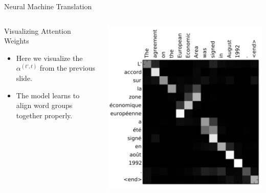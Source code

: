 \documentclass[aspectratio=169]{beamer}
\begin{document}
\begin{frame}{Neural Machine Translation}
\begin{columns}
\begin{column}{0.5\textwidth}
   \centering
   Visualizing Attention Weights   
   \vspace{.5cm}
   
   \raggedright
   \begin{itemize}
   	\item Here we visualize the $\alpha^{(t', t)}$ from the previous slide.
   	\item The model learns to align word groups together properly.
   \end{itemize}
\end{column}
\begin{column}{0.5\textwidth}  %
    \begin{center}
    \vspace{-1cm}
    \includegraphics[width=\textwidth]{figures/attention_visualisation}
    \end{center}
\end{column}
\end{columns}
\end{frame}
\end{document}
